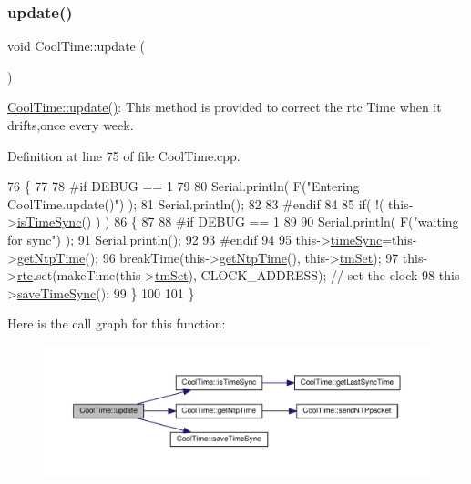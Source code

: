 \subsubsection{\texorpdfstring{update()}{update()}}
{\footnotesize\ttfamily void Cool\+Time\+::update (\begin{DoxyParamCaption}{ }\end{DoxyParamCaption})}

\hyperlink{class_cool_time_aae601f795452cfa48d9fb337aed483a8}{Cool\+Time\+::update()}\+: This method is provided to correct the rtc Time when it drifts,once every week. 

Definition at line 75 of file Cool\+Time.\+cpp.


\begin{DoxyCode}
76 \{
77 
78 \textcolor{preprocessor}{#if DEBUG == 1}
79 
80     Serial.println( F(\textcolor{stringliteral}{"Entering CoolTime.update()"}) );
81     Serial.println();
82 
83 \textcolor{preprocessor}{#endif }
84 
85     \textcolor{keywordflow}{if}( !( this->\hyperlink{class_cool_time_a5ae038a4498602b189f76a10bf02adf8}{isTimeSync}() ) )
86     \{
87     
88 \textcolor{preprocessor}{    #if DEBUG == 1}
89 
90         Serial.println( F(\textcolor{stringliteral}{"waiting for sync"}) );
91         Serial.println();
92 
93 \textcolor{preprocessor}{    #endif }
94 
95         this->\hyperlink{class_cool_time_a9d032e76c3470a15b3bbbc52af6463f7}{timeSync}=this->\hyperlink{class_cool_time_a41fbbbfd651c2079f54d4b2911e4c705}{getNtpTime}();
96         breakTime(this->\hyperlink{class_cool_time_a41fbbbfd651c2079f54d4b2911e4c705}{getNtpTime}(), this->\hyperlink{class_cool_time_ad33c2713c903ff064ad09c46406ae088}{tmSet});
97         this->\hyperlink{class_cool_time_abd38f2384ff90692b1568d9db869412e}{rtc}.set(makeTime(this->\hyperlink{class_cool_time_ad33c2713c903ff064ad09c46406ae088}{tmSet}), CLOCK\_ADDRESS); \textcolor{comment}{// set the clock}
98         this->\hyperlink{class_cool_time_ae9658c9b377510d469e3b88edf33ee85}{saveTimeSync}();
99     \}
100     
101 \}
\end{DoxyCode}
Here is the call graph for this function\+:\nopagebreak
\begin{figure}[H]
\begin{center}
\leavevmode
\includegraphics[width=350pt]{d6/d49/class_cool_time_aae601f795452cfa48d9fb337aed483a8_cgraph}
\end{center}
\end{figure}
